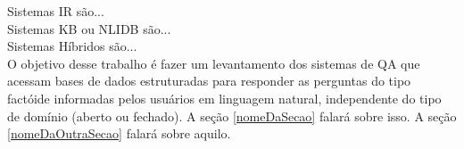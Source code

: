 \documentclass{article}
\begin{document}
Sistemas IR são...\\

Sistemas KB ou NLIDB são...\\

Sistemas Híbridos são...\\

O objetivo desse trabalho é fazer um levantamento dos sistemas de QA que acessam bases de dados estruturadas para responder as perguntas do tipo factóide informadas pelos usuários em linguagem natural, independente do tipo de domínio (aberto ou fechado). A seção \ref{nomeDaSecao} falará sobre isso. A seção \ref{nomeDaOutraSecao} falará sobre aquilo.










\end{document}
